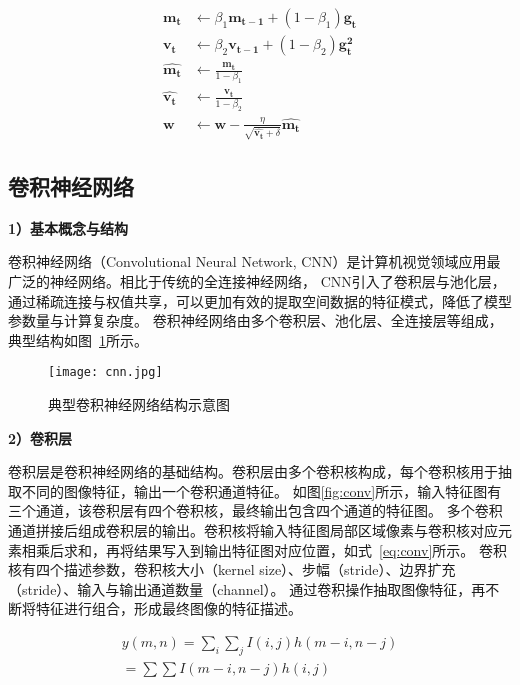 \begin{equation}
  \begin{aligned}
    \boldsymbol{m_t}  & \leftarrow  \beta_1 \boldsymbol{m_{t-1}}  + (1 - \beta_1) \boldsymbol{g_t} \\
    \boldsymbol{v_t}  & \leftarrow  \beta_2 \boldsymbol{v_{t-1}}  + (1 - \beta_2) \boldsymbol{g_t^2} \\
    \boldsymbol{\hat{m_t}} &  \leftarrow \frac{\boldsymbol{m_t}}{1 - \beta_1} \\
    \boldsymbol{\hat{v_t}} &  \leftarrow \frac{\boldsymbol{v_t}}{1 - \beta_2} \\
    \boldsymbol{w}  & \leftarrow  \boldsymbol{w} - \frac{\eta}{\sqrt{\boldsymbol{\hat{v_t}} + \delta}} \boldsymbol{\hat{m_t}}
  \end{aligned}
  \label{eq:Adam}
\end{equation}




\subsection{卷积神经网络}

\textbf{1）基本概念与结构}

卷积神经网络（Convolutional Neural Network, CNN）是计算机视觉领域应用最广泛的神经网络。相比于传统的全连接神经网络，
CNN引入了卷积层与池化层，通过稀疏连接与权值共享，可以更加有效的提取空间数据的特征模式，降低了模型参数量与计算复杂度。
卷积神经网络由多个卷积层、池化层、全连接层等组成，典型结构如图~\ref{fig:cnn}所示。

\begin{figure}
  \centering
  \texttt{[image: cnn.jpg]}
  \caption{典型卷积神经网络结构示意图}
  \label{fig:cnn}
\end{figure}

\textbf{2）卷积层}

卷积层是卷积神经网络的基础结构。卷积层由多个卷积核构成，每个卷积核用于抽取不同的图像特征，输出一个卷积通道特征。
如图\ref{fig:conv}所示，输入特征图有三个通道，该卷积层有四个卷积核，最终输出包含四个通道的特征图。
多个卷积通道拼接后组成卷积层的输出。卷积核将输入特征图局部区域像素与卷积核对应元素相乘后求和，再将结果写入到输出特征图对应位置，如式~\ref{eq:conv}所示。
卷积核有四个描述参数，卷积核大小（kernel size）、步幅（stride）、边界扩充（stride）、输入与输出通道数量（channel）。
通过卷积操作抽取图像特征，再不断将特征进行组合，形成最终图像的特征描述。

\begin{equation}
  \begin{array}{l}
    y(m, n)=\sum_{i} \sum_{j} I(i, j) h(m-i, n-j) \\
    =\sum \sum I(m-i, n-j) h(i, j)
    \end{array}
  \label{eq:conv}
\end{equation}

